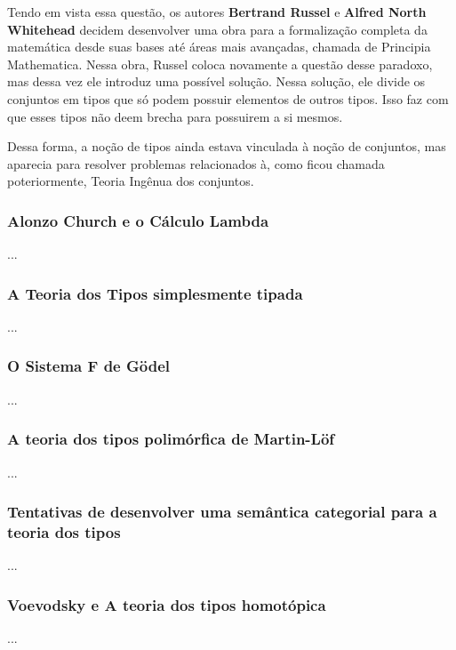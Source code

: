 \documentclass[../main.tex]{subfiles}
\begin{document}
Tendo em vista essa questão, os autores \textbf{Bertrand Russel} e \textbf{Alfred North Whitehead} decidem desenvolver uma obra para a formalização completa da matemática desde suas bases até áreas mais avançadas, chamada de Principia Mathematica. Nessa obra, Russel coloca novamente a questão desse paradoxo, mas dessa vez ele introduz uma possível solução. Nessa solução, ele divide os conjuntos em tipos que só podem possuir elementos de outros tipos. Isso faz com que esses tipos não deem brecha para possuirem a si mesmos.


Dessa forma, a noção de tipos ainda estava vinculada à noção de conjuntos, mas aparecia para resolver problemas relacionados à, como ficou chamada poteriormente, Teoria Ingênua dos conjuntos.

\subsubsection{Alonzo Church e o Cálculo Lambda}

...

\subsubsection{A Teoria dos Tipos simplesmente tipada}

...

\subsubsection{O Sistema F de Gödel}

...

\subsubsection{A teoria dos tipos polimórfica de Martin-Löf}

...

\subsubsection{Tentativas de desenvolver uma semântica categorial para a teoria dos tipos}

...

\subsubsection{Voevodsky e A teoria dos tipos homotópica}

...
\end{document}
